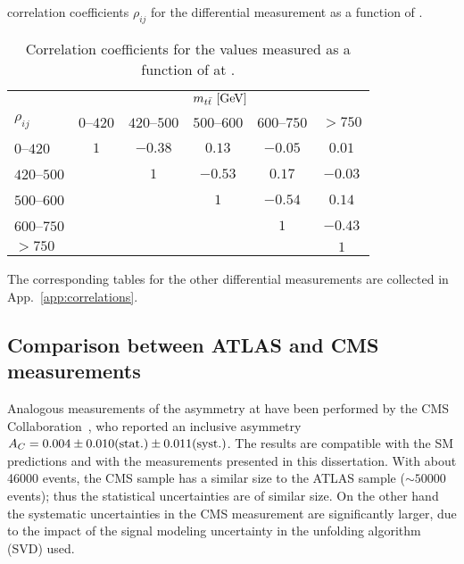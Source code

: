 correlation coefficients $\rho_{ij}$ for the differential \ac{}
measurement as a function of \mtt{}.
\begin{table}[!htp]\centering
\begin{tabular}{l c c c c c }
  \toprule
  &\multicolumn{5}{c}{$m_{t\bar{t}}{}~[\rm{GeV}]$}    \\
  $\rho_{ij}$ & $0$--$420$ & $420$--$500$ & $500$--$600$ & $600$--$750$ & $>750$ \\
  \midrule
  $0$--$420$      & $1$ & $-0.38$ & $0.13$  & $-0.05$ & $0.01$  \\
  $420$--$500$    &     & $1$     & $-0.53$ & $0.17$  & $-0.03$ \\
  $500$--$600$    &     &         & $1$     & $-0.54$ & $0.14$  \\
  $600$--$750$    &     &         &         & $1$     & $-0.43$ \\
  $>750$          &     &         &         &         & $1$     \\
  \bottomrule
\end{tabular}
\caption{Correlation coefficients for the \ac{} values measured as a
  function of \mtt{} at \seventev{}.} 
\label{tab:corr_mtt}
\end{table}
The corresponding tables for the other differential measurements are
collected in App.~\ref{app:correlations}.

\subsection{Comparison between ATLAS and CMS measurements}

Analogous measurements of the asymmetry \ac{} at \seventev{} have been
performed by the CMS Collaboration~\cite{Chatrchyan:2012cxa}, who
reported an inclusive asymmetry
$A_C{}=0.004\pm0.010(\rm{stat.})\pm0.011(\rm{syst.})$.
The results are compatible with the SM predictions and with the
measurements presented in this dissertation. 
With about 46000 \ttbar{} events, the CMS sample has a similar size to the
ATLAS sample ($\sim50000$ events); thus the statistical uncertainties are
of similar size. On the other hand the systematic uncertainties in the CMS
measurement are significantly larger, due to the impact of the signal
modeling uncertainty in the unfolding algorithm (SVD) used.

